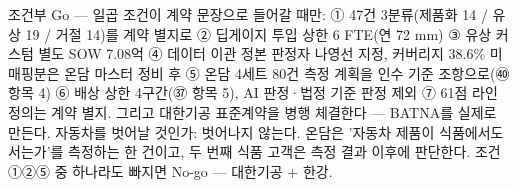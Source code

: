 \documentclass[10pt,a4paper]{article}
\begin{document}
\begin{fieldbox}
\ifwbblank
{}
\else
조건부 Go — 일곱 조건이 계약 문장으로 들어갈 때만: ① 47건 3분류(제품화 14 / 유상 19 / 거절 14)를 계약 별지로 ② 딥게이지 투입 상한 6 FTE(연 72 mm) ③ 유상 커스텀 별도 SOW 7.08억 ④ 데이터 이관 정본 판정자 나영선 지정, 커버리지 38.6\% 미매핑분은 온담 마스터 정비 후 ⑤ 온담 4세트 80건 측정 계획을 인수 기준 조항으로(㊵ 항목 4) ⑥ 배상 상한 4구간(㊲ 항목 5), AI 판정·법정 기준 판정 제외 ⑦ 61점 라인 정의는 계약 별지. 그리고 대한기공 표준계약을 병행 체결한다 — BATNA를 실제로 만든다. 자동차를 벗어날 것인가: 벗어나지 않는다. 온담은 '자동차 제품이 식품에서도 서는가'를 측정하는 한 건이고, 두 번째 식품 고객은 측정 결과 이후에 판단한다. 조건 ①②⑤ 중 하나라도 빠지면 No-go — 대한기공 + 한강.
\fi
\end{fieldbox}
\end{document}
